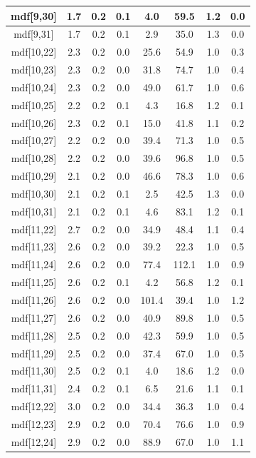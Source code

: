 \begin{longtable}{|c|c|c|c|c|c|c|c|}
mdf[9,30] & 1.7 & 0.2 & 0.1 & 4.0 & 59.5 & 1.2 & 0.0 \\
\hline
mdf[9,31] & 1.7 & 0.2 & 0.1 & 2.9 & 35.0 & 1.3 & 0.0 \\
\hline
mdf[10,22] & 2.3 & 0.2 & 0.0 & 25.6 & 54.9 & 1.0 & 0.3 \\
\hline
mdf[10,23] & 2.3 & 0.2 & 0.0 & 31.8 & 74.7 & 1.0 & 0.4 \\
\hline
mdf[10,24] & 2.3 & 0.2 & 0.0 & 49.0 & 61.7 & 1.0 & 0.6 \\
\hline
mdf[10,25] & 2.2 & 0.2 & 0.1 & 4.3 & 16.8 & 1.2 & 0.1 \\
\hline
mdf[10,26] & 2.3 & 0.2 & 0.1 & 15.0 & 41.8 & 1.1 & 0.2 \\
\hline
mdf[10,27] & 2.2 & 0.2 & 0.0 & 39.4 & 71.3 & 1.0 & 0.5 \\
\hline
mdf[10,28] & 2.2 & 0.2 & 0.0 & 39.6 & 96.8 & 1.0 & 0.5 \\
\hline
mdf[10,29] & 2.1 & 0.2 & 0.0 & 46.6 & 78.3 & 1.0 & 0.6 \\
\hline
mdf[10,30] & 2.1 & 0.2 & 0.1 & 2.5 & 42.5 & 1.3 & 0.0 \\
\hline
mdf[10,31] & 2.1 & 0.2 & 0.1 & 4.6 & 83.1 & 1.2 & 0.1 \\
\hline
mdf[11,22] & 2.7 & 0.2 & 0.0 & 34.9 & 48.4 & 1.1 & 0.4 \\
\hline
mdf[11,23] & 2.6 & 0.2 & 0.0 & 39.2 & 22.3 & 1.0 & 0.5 \\
\hline
mdf[11,24] & 2.6 & 0.2 & 0.0 & 77.4 & 112.1 & 1.0 & 0.9 \\
\hline
mdf[11,25] & 2.6 & 0.2 & 0.1 & 4.2 & 56.8 & 1.2 & 0.1 \\
\hline
mdf[11,26] & 2.6 & 0.2 & 0.0 & 101.4 & 39.4 & 1.0 & 1.2 \\
\hline
mdf[11,27] & 2.6 & 0.2 & 0.0 & 40.9 & 89.8 & 1.0 & 0.5 \\
\hline
mdf[11,28] & 2.5 & 0.2 & 0.0 & 42.3 & 59.9 & 1.0 & 0.5 \\
\hline
mdf[11,29] & 2.5 & 0.2 & 0.0 & 37.4 & 67.0 & 1.0 & 0.5 \\
\hline
mdf[11,30] & 2.5 & 0.2 & 0.1 & 4.0 & 18.6 & 1.2 & 0.0 \\
\hline
mdf[11,31] & 2.4 & 0.2 & 0.1 & 6.5 & 21.6 & 1.1 & 0.1 \\
\hline
mdf[12,22] & 3.0 & 0.2 & 0.0 & 34.4 & 36.3 & 1.0 & 0.4 \\
\hline
mdf[12,23] & 2.9 & 0.2 & 0.0 & 70.4 & 76.6 & 1.0 & 0.9 \\
\hline
mdf[12,24] & 2.9 & 0.2 & 0.0 & 88.9 & 67.0 & 1.0 & 1.1 \\

\end{longtable}
